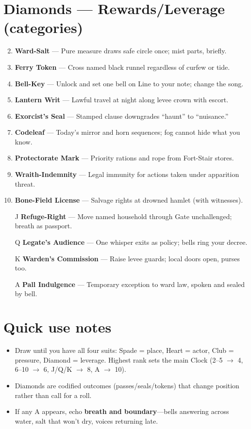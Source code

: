 \section*{Diamonds --- Rewards/Leverage (categories)}
\label{sec:mistlands-rewards}
\begin{enumerate}
\setcounter{enumi}{1}
\item \textbf{Ward-Salt} --- Pure measure draws safe circle once; mist parts, briefly.
\item \textbf{Ferry Token} --- Cross named black runnel regardless of curfew or tide.
\item \textbf{Bell-Key} --- Unlock and set one bell on Line to your note; change the song.
\item \textbf{Lantern Writ} --- Lawful travel at night along levee crown with escort.
\item \textbf{Exorcist's Seal} --- Stamped clause downgrades ``haunt'' to ``nuisance.''
\item \textbf{Codeleaf} --- Today's mirror and horn sequences; fog cannot hide what you know.
\item \textbf{Protectorate Mark} --- Priority rations and rope from Fort-Stair stores.
\item \textbf{Wraith-Indemnity} --- Legal immunity for actions taken under apparition threat.
\item \textbf{Bone-Field License} --- Salvage rights at drowned hamlet (with witnesses).
\item[J] \textbf{Refuge-Right} --- Move named household through Gate unchallenged; breath as passport.
\item[Q] \textbf{Legate's Audience} --- One whisper exits as policy; bells ring your decree.
\item[K] \textbf{Warden's Commission} --- Raise levee guards; local doors open, purses too.
\item[A] \textbf{Pall Indulgence} --- Temporary exception to ward law, spoken and sealed by bell.
\end{enumerate}

\section*{Quick use notes}
\label{sec:mistlands-quick-use}
\begin{itemize}
\item Draw until you have all four suits: Spade = place, Heart = actor, Club = pressure, Diamond = leverage. Highest rank sets the main Clock (2--5 $\rightarrow$ 4, 6--10 $\rightarrow$ 6, J/Q/K $\rightarrow$ 8, A $\rightarrow$ 10).
\item Diamonds are codified outcomes (passes/seals/tokens) that change position rather than call for a roll.
\item If any A appears, echo \textbf{breath and boundary}---bells answering across water, salt that won't dry, voices returning late.
\end{itemize}

